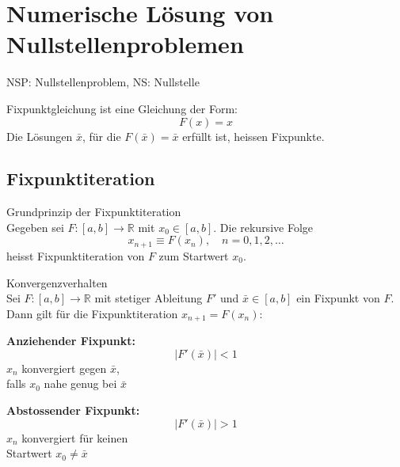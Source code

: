 \section{Numerische Lösung von Nullstellenproblemen}

\begin{remark}
    NSP: Nullstellenproblem, NS: Nullstelle
\end{remark}



\begin{definition}{Fixpunktgleichung}
ist eine Gleichung der Form: $$F(x)=x$$ 
Die Lösungen $\bar{x}$, für die $F(\bar{x})=\bar{x}$ erfüllt ist, heissen Fixpunkte.
\end{definition}

\subsection{Fixpunktiteration}

\begin{concept}{Grundprinzip der Fixpunktiteration}\\
Gegeben sei $F:[a,b] \rightarrow \mathbb{R}$ mit $x_0 \in [a,b]$. Die rekursive Folge
$$x_{n+1} \equiv F(x_n), \quad n=0,1,2,\ldots$$
heisst Fixpunktiteration von $F$ zum Startwert $x_0$.
\end{concept}

\begin{theorem}{Konvergenzverhalten}\\
Sei $F:[a,b] \rightarrow \mathbb{R}$ mit stetiger Ableitung $F'$ und $\bar{x} \in [a,b]$ ein Fixpunkt von $F$. Dann gilt für die Fixpunktiteration $x_{n+1}=F(x_n)$:
\vspace{1mm}\\
\begin{minipage}[t]{0.45\textwidth}
    \textbf{Anziehender Fixpunkt:}
    $$|F'(\bar{x})| < 1$$
    $x_n$ konvergiert gegen $\bar{x}$,\\
    falls $x_0$ nahe genug bei $\bar{x}$
\end{minipage}
\hspace{3mm}
\begin{minipage}[t]{0.45\textwidth}
    \textbf{Abstossender Fixpunkt:}
    $$|F'(\bar{x})| > 1$$
    $x_n$ konvergiert für keinen\\
    Startwert $x_0 \neq \bar{x}$
\end{minipage}
\end{theorem}

